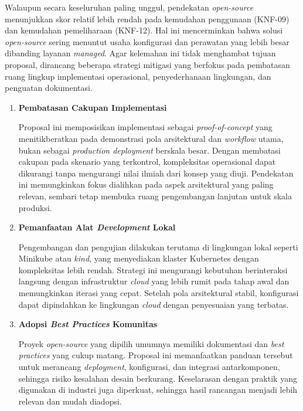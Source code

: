 Walaupun secara keseluruhan paling unggul, pendekatan \textit{open-source} menunjukkan skor relatif lebih rendah pada kemudahan penggunaan (KNF-09) dan kemudahan pemeliharaan (KNF-12). Hal ini mencerminkan bahwa solusi \textit{open-source} sering menuntut usaha konfigurasi dan perawatan yang lebih besar dibanding layanan \textit{managed}. Agar kelemahan ini tidak menghambat tujuan proposal, dirancang beberapa strategi mitigasi yang berfokus pada pembatasan ruang lingkup implementasi operasional, penyederhanaan lingkungan, dan penguatan dokumentasi.

\vspace{0.5em}
\begin{enumerate}
    \item \textbf{Pembatasan Cakupan Implementasi}
    
    Proposal ini memposisikan implementasi sebagai \textit{proof-of-concept} yang menitikberatkan pada demonstrasi pola arsitektural dan \textit{workflow} utama, bukan sebagai \textit{production deployment} berskala besar. Dengan membatasi cakupan pada skenario yang terkontrol, kompleksitas operasional dapat dikurangi tanpa mengurangi nilai ilmiah dari konsep yang diuji. Pendekatan ini memungkinkan fokus dialihkan pada aspek arsitektural yang paling relevan, sembari tetap membuka ruang pengembangan lanjutan untuk skala produksi.

    \vspace{0.5em}

    \item \textbf{Pemanfaatan Alat \textit{Development} Lokal}
    
    Pengembangan dan pengujian dilakukan terutama di lingkungan lokal seperti Minikube atau \textit{kind}, yang menyediakan klaster Kubernetes dengan kompleksitas lebih rendah. Strategi ini mengurangi kebutuhan berinteraksi langsung dengan infrastruktur \textit{cloud} yang lebih rumit pada tahap awal dan memungkinkan iterasi yang cepat. Setelah pola arsitektural stabil, konfigurasi dapat dipindahkan ke lingkungan \textit{cloud} dengan penyesuaian yang terbatas.

    \vspace{0.5em}

    \item \textbf{Adopsi \textit{Best Practices} Komunitas}
    
    Proyek \textit{open-source} yang dipilih umumnya memiliki dokumentasi dan \textit{best practices} yang cukup matang. Proposal ini memanfaatkan panduan tersebut untuk merancang \textit{deployment}, konfigurasi, dan integrasi antarkomponen, sehingga risiko kesalahan desain berkurang. Keselarasan dengan praktik yang digunakan di industri juga diperkuat, sehingga hasil rancangan menjadi lebih relevan dan mudah diadopsi.


\end{enumerate}
